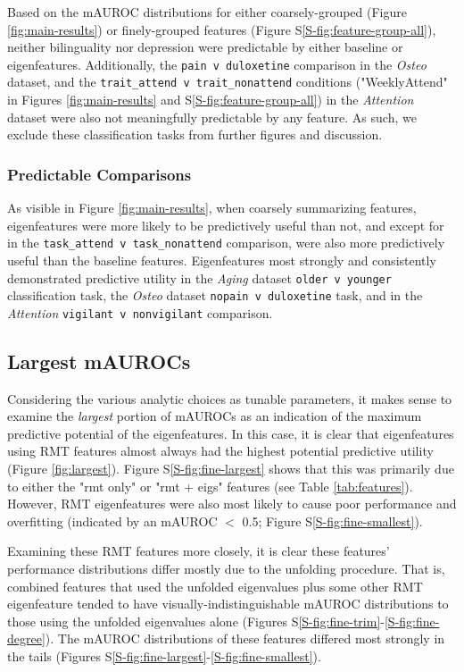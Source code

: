 \documentclass[12pt]{spieman}  %
\newcommand{\code}[1]{\small\texttt{#1}\normalsize}
\begin{document}
\begin{spacing}{2}
Based on the mAUROC distributions for either coarsely-grouped (Figure
\ref{fig:main-results}) or finely-grouped features (Figure
S\ref{S-fig:feature-group-all}), neither bilinguality nor depression were
predictable by either baseline or eigenfeatures. Additionally, the \code{pain v
duloxetine} comparison in the \textit{Osteo} dataset, and the
\code{trait\_attend v trait\_nonattend} conditions ("WeeklyAttend" in Figures
\ref{fig:main-results} and S\ref{S-fig:feature-group-all}) in the \textit{Attention}
dataset were also not meaningfully predictable by any feature. As such, we exclude
these classification tasks from further figures and discussion.

\subsubsection{Predictable Comparisons}
As visible in Figure \ref{fig:main-results}, when coarsely summarizing
features, eigenfeatures were more likely to be predictively useful than not,
and except for in the \code{task\_attend v task\_nonattend} comparison, were
also more predictively useful than the baseline features.  Eigenfeatures most
strongly and consistently demonstrated predictive utility in the \textit{Aging}
dataset \code{older v younger} classification task, the \textit{Osteo} dataset
\code{nopain v duloxetine} task, and in the \textit{Attention} \code{vigilant v
nonvigilant} comparison.



\subsection{Largest mAUROCs}
Considering the various analytic choices as tunable parameters, it makes sense
to examine the \textit{largest} portion of mAUROCs as an indication of the
maximum predictive potential of the eigenfeatures. In this case, it is clear
that eigenfeatures using RMT features almost always had the highest potential
predictive utility (Figure \ref{fig:largest}). Figure S\ref{S-fig:fine-largest}
shows that this was primarily due to either the "rmt only" or "rmt + eigs"
features (see Table \ref{tab:features}). However, RMT eigenfeatures were also most
likely to cause poor performance and overfitting (indicated by an mAUROC \(<\)
0.5; Figure S\ref{S-fig:fine-smallest}).

Examining these RMT features more closely, it is clear these features'
performance distributions differ mostly due to the unfolding procedure. That
is, combined features that used the unfolded eigenvalues plus some other RMT
eigenfeature tended to have visually-indistinguishable mAUROC distributions to
those using the unfolded eigenvalues alone (Figures
S\ref{S-fig:fine-trim}-\ref{S-fig:fine-degree}). The mAUROC distributions of
these features differed most strongly in the tails (Figures
S\ref{S-fig:fine-largest}-\ref{S-fig:fine-smallest}).



\end{spacing}
\end{document}
